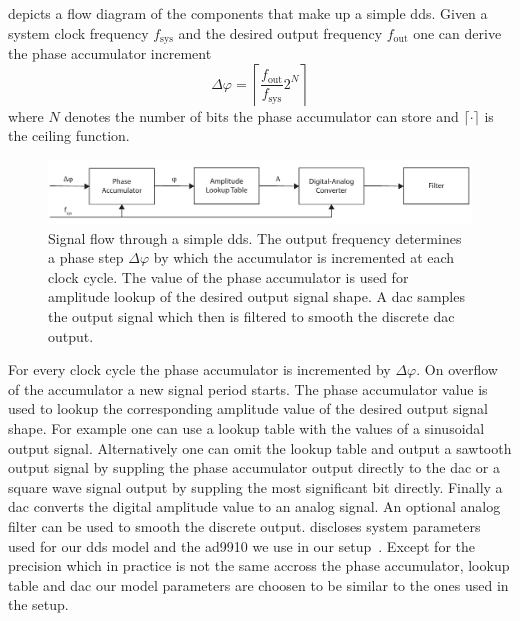  depicts a flow diagram of the components
that make up a simple \gls{dds}. Given a system clock frequency $f_\text{sys}$
and the desired output frequency $f_\text{out}$ one can derive the phase
accumulator increment
\begin{equation}
  \Delta\varphi
  =
  \left\lceil\frac{f_\text{out}}{f_\text{sys}}2^N\right\rceil
  \label{eq:dds_phase_increment}
\end{equation}
where $N$ denotes the number of bits the phase accumulator can store and
$\lceil\cdot\rceil$ is the ceiling function.
\begin{figure}[htb]
  \centering
  \includegraphics[width=\textwidth]
  {../figure/digital-signal-synthesis/simple-architecture.pdf}
  \caption{Signal flow through a simple \gls{dds}. The output frequency
    determines a phase step $\Delta\varphi$ by which the accumulator is incremented at each
    clock cycle. The value of the phase accumulator is used for amplitude
    lookup of the desired output signal shape. A \gls{dac} samples the output
    signal which then is filtered to smooth the discrete \gls{dac} output.
  }\label{fig:dds_simple_architecture}
\end{figure}
For every clock cycle the phase accumulator is incremented by $\Delta\varphi$.
On overflow of the accumulator a new signal period starts. The phase
accumulator value is used to lookup the corresponding amplitude value of the
desired output signal shape. For example one can use a lookup table with the
values of a sinusoidal output signal. Alternatively one can omit the lookup
table and output a sawtooth output signal by suppling the phase accumulator
output directly to the \gls{dac} or a square wave signal output by suppling
the most significant bit directly. Finally a \gls{dac} converts the digital
amplitude value to an analog signal. An optional analog filter can be used to
smooth the discrete output.  discloses system
parameters used for our \gls{dds} model and the \gls{ad9910} we use in our
setup~\cite{AD9910}. Except for the precision which in practice is not the
same accross the phase accumulator, lookup table and \gls{dac} our model
parameters are choosen to be similar to the ones used in the setup.
